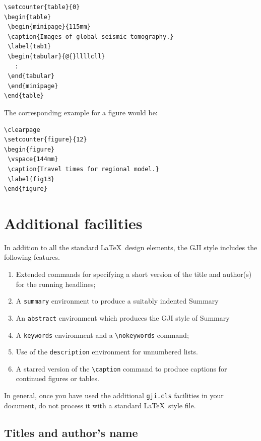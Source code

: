 \documentclass{gji}
\begin{document}
\begin{enumerate}
\begin{verbatim}
\setcounter{table}{0}
\begin{table}
 \begin{minipage}{115mm}
 \caption{Images of global seismic tomography.}
 \label{tab1}
 \begin{tabular}{@{}llllcll}
   :
 \end{tabular}
 \end{minipage}
\end{table}
\end{verbatim}
The corresponding example for a figure would be:
\begin{verbatim}
\clearpage
\setcounter{figure}{12}
\begin{figure}
 \vspace{144mm}
 \caption{Travel times for regional model.}
 \label{fig13}
\end{figure}
\end{verbatim}
\end{enumerate}


\section{Additional facilities}

In addition to all the standard \LaTeX\ design elements, the GJI style
includes the following features.
\begin{enumerate}
  \item Extended commands for specifying a short version of the title and
        author(s) for the running headlines;
  \item A \verb"summary" environment to produce a suitably indented
        Summary
  \item An \verb"abstract" environment which produces the GJI style of
        Summary
  \item A \verb"keywords" environment and a \verb"\nokeywords" command;
  \item Use of the \verb"description" environment for unnumbered lists.
  \item A starred version of the \verb"\caption" command to produce
        captions for continued figures or tables.
 \end{enumerate}
 In general, once you have used the additional \verb"gji.cls" facilities
in your document, do not process it with a standard \LaTeX\ style file.

\subsection{Titles and author's name}
\end{document}
